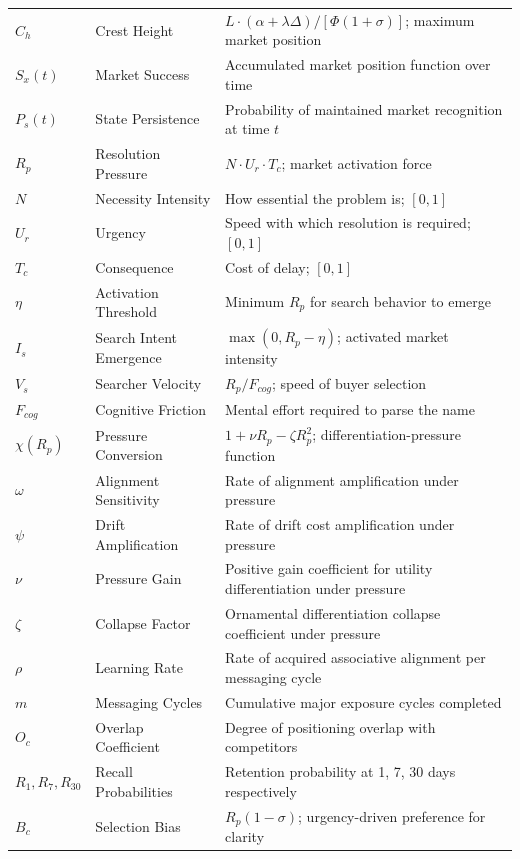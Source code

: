 \documentclass[12pt, openany]{book}
\theoremstyle{thmstyle}
\theoremstyle{defstyle}
\begin{document}
\begin{longtable}{@{}p{1.0in} p{1.3in} p{3.5in}@{}}
$C_h$ & Crest Height & $L \cdot (\alpha+\lambda\Delta)/[\Phi(1+\sigma)]$; maximum market position \\[3pt]
$S_x(t)$ & Market Success & Accumulated market position function over time \\[3pt]
$P_s(t)$ & State Persistence & Probability of maintained market recognition at time $t$ \\[3pt]
$R_p$ & Resolution Pressure & $N \cdot U_r \cdot T_c$; market activation force \\[3pt]
$N$ & Necessity Intensity & How essential the problem is; $[0,1]$ \\[3pt]
$U_r$ & Urgency & Speed with which resolution is required; $[0,1]$ \\[3pt]
$T_c$ & Consequence & Cost of delay; $[0,1]$ \\[3pt]
$\eta$ & Activation Threshold & Minimum $R_p$ for search behavior to emerge \\[3pt]
$I_s$ & Search Intent Emergence & $\max(0, R_p - \eta)$; activated market intensity \\[3pt]
$V_s$ & Searcher Velocity & $R_p/F_{cog}$; speed of buyer selection \\[3pt]
$F_{cog}$ & Cognitive Friction & Mental effort required to parse the name \\[3pt]
$\chi(R_p)$ & Pressure Conversion & $1 + \nu R_p - \zeta R_p^2$; differentiation-pressure function \\[3pt]
$\omega$ & Alignment Sensitivity & Rate of alignment amplification under pressure \\[3pt]
$\psi$ & Drift Amplification & Rate of drift cost amplification under pressure \\[3pt]
$\nu$ & Pressure Gain & Positive gain coefficient for utility differentiation under pressure \\[3pt]
$\zeta$ & Collapse Factor & Ornamental differentiation collapse coefficient under pressure \\[3pt]
$\rho$ & Learning Rate & Rate of acquired associative alignment per messaging cycle \\[3pt]
$m$ & Messaging Cycles & Cumulative major exposure cycles completed \\[3pt]
$O_c$ & Overlap Coefficient & Degree of positioning overlap with competitors \\[3pt]
$R_1, R_7, R_{30}$ & Recall Probabilities & Retention probability at 1, 7, 30 days respectively \\[3pt]
$B_c$ & Selection Bias & $R_p(1-\sigma)$; urgency-driven preference for clarity \\[3pt]

\end{longtable}
\end{document}
